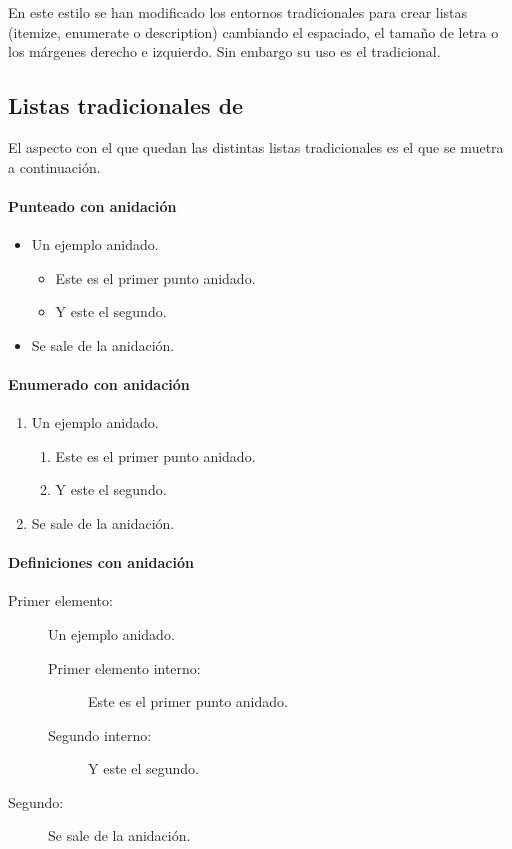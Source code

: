 En este estilo se han modificado los entornos tradicionales para crear listas (itemize, enumerate o description) cambiando el espaciado, el tamaño de letra o los márgenes derecho e izquierdo. Sin embargo su uso es el tradicional.

\subsection{Listas tradicionales de \LaTeXe}

El aspecto con el que quedan las distintas listas tradicionales es el que se muetra a continuación.

\paragraph{Punteado con anidación}
\begin{itemize}
        \item Un ejemplo anidado.
        \begin{itemize}
                \item Este es el primer punto anidado.
                \item Y este el segundo.
        \end{itemize}
        \item Se sale de la anidación.
\end{itemize}

\paragraph{Enumerado con anidación}
\begin{enumerate}
        \item Un ejemplo anidado.
        \begin{enumerate}
                \item Este es el primer punto anidado.
                \item Y este el segundo.
        \end{enumerate}
        \item Se sale de la anidación.
\end{enumerate}

\paragraph{Definiciones con anidación}

\begin{description}
        \item[Primer elemento:] Un ejemplo anidado.
        \begin{description}
                \item [Primer elemento interno:] Este es el primer punto anidado.
                \item [Segundo interno:] Y este el segundo.
        \end{description}
        \item [Segundo:] Se sale de la anidación.
\end{description}


